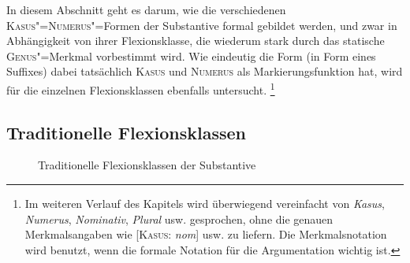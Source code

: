 \label{sec:subst}

In diesem Abschnitt geht es darum, wie die verschiedenen \textsc{Kasus}"=\textsc{Numerus}"=Formen der Substantive formal gebildet werden, und zwar in Abhängigkeit von ihrer Flexionsklasse, die wiederum stark durch das statische \textsc{Genus}"=Merkmal vorbestimmt wird.
Wie eindeutig die Form (\zB in Form eines Suffixes) dabei tatsächlich \textsc{Kasus} und \textsc{Numerus} als Markierungsfunktion hat, wird für die einzelnen Flexionsklassen ebenfalls untersucht.%
\footnote{Im weiteren Verlauf des Kapitels wird überwiegend vereinfacht von \textit{Kasus}, \textit{Numerus}, \textit{Nominativ}, \textit{Plural} usw. gesprochen, ohne die genauen Merkmalsangaben wie [\textsc{Kasus}: \textit{nom}] usw. zu liefern.
Die Merkmalsnotation wird benutzt, wenn die formale Notation für die Argumentation wichtig ist.}

\subsection{Traditionelle Flexionsklassen}

\label{sec:nominaflexionsklassen}
\label{Substantiv!Flexion}

\begin{figure}[!htbp]
  \caption{Traditionelle Flexionsklassen der Substantive}
  \label{fig:substflexklassen}
\end{figure}

